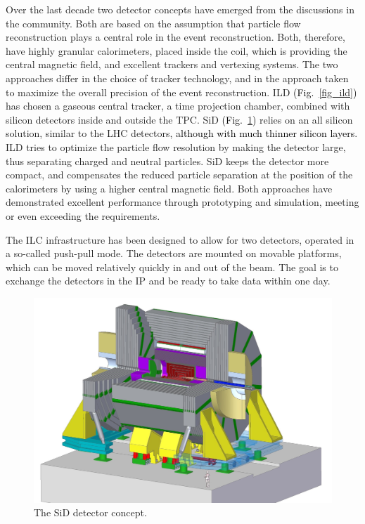 \documentclass[%
 reprint,
 amsmath,amssymb,
 aps,
]{revtex4-1}
\newcommand{\jim}[1]{\textcolor{black}{#1}}
\def\Fig#1{Fig.~\ref{#1}}
\begin{document}
Over the last decade two detector concepts have emerged from the discussions in the community. Both are based on the assumption that particle flow reconstruction plays a central role in the event reconstruction. Both, therefore, have highly granular calorimeters, placed inside the coil, which is providing the central magnetic field, and excellent trackers and vertexing systems. The two approaches differ in the choice of tracker technology, and in the approach taken to maximize the overall precision of the event reconstruction. ILD \jim{(\Fig{fig_ild})} has chosen a gaseous central tracker, a time projection chamber, combined with silicon detectors inside and outside the TPC. SiD \jim{(\Fig{fig_sid})} relies on an all silicon solution, similar to the LHC detectors, \jim{although with
much thinner silicon layers}. ILD tries to optimize the particle flow resolution by making the detector large, thus separating charged and neutral particles. SiD keeps the detector more compact, and compensates the reduced particle separation at the position of the calorimeters by using a higher central magnetic field. Both approaches have demonstrated excellent performance through prototyping and simulation, meeting or even exceeding the requirements. 

The ILC infrastructure has been designed to allow for two detectors, operated in a so-called push-pull mode. The detectors are mounted on movable platforms, which can be moved relatively quickly in and out of the beam. The goal is to exchange the detectors in the IP and be ready to take data within one day. 

\begin{figure}[tb]
 \begin{center}
 \includegraphics[width=\hsize]{figures/SiD.jpg}
\caption{The SiD detector concept.
\label{fig_sid}}
 \end{center}
 \end{figure}
\end{document}
